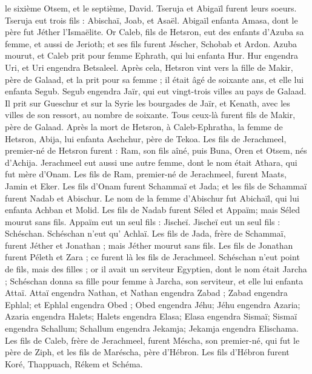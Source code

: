\begin{multicols}{2}
le sixième Otsem, et le septième, David.
Tseruja et Abigaïl furent leurs soeurs. Tseruja eut trois fils : Abischaï, Joab, et Asaël.
Abigaïl enfanta Amasa, dont le père fut Jéther l’Ismaëlite.
Or Caleb, fils de Hetsron, eut des enfants d’Azuba sa femme, et aussi de Jerioth; et ses fils furent Jéscher, Schobab et Ardon.
Azuba mourut, et Caleb prit pour femme Ephrath, qui lui enfanta Hur.
Hur engendra Uri, et Uri engendra Betsaleel.
Après cela, Hetsron vint vers la fille de Makir, père de Galaad, et la prit pour sa femme ; il était âgé de soixante ans, et elle lui enfanta Segub.
Segub engendra Jaïr, qui eut vingt-trois villes au pays de Galaad.
Il prit sur Gueschur et sur la Syrie les bourgades de Jaïr, et Kenath, avec les villes de son ressort, au nombre de soixante. Tous ceux-là furent fils de Makir, père de Galaad.
Après la mort de Hetsron, à Caleb-Ephratha, la femme de Hetsron, Abija, lui enfanta Aschchur, père de Tekoa.
Les fils de Jerachmeel, premier-né de Hetsron furent : Ram, son fils aîné, puis Buna, Oren et Otsem, nés d'Achija.
Jerachmeel eut aussi une autre femme, dont le nom était Athara, qui fut mère d'Onam.
Les fils de Ram, premier-né de Jerachmeel, furent Maats, Jamin et Eker.
Les fils  d'Onam furent  Schammaï et Jada; et les fils de Schammaï furent  Nadab et Abischur.
Le nom de la femme d'Abischur fut Abichaïl, qui lui enfanta Achban et Molid.
Les fils de Nadab furent Séled et Appaïm; mais Séled mourut sans fils.
Appaïm eut un seul fils : Jischeï. Jischeï eut un seul fils : Schéschan. Schéschan n'eut qu' Achlaï.
Les fils de Jada, frère de Schammaï, furent Jéther et Jonathan ; mais Jéther mourut sans fils.
Les fils de Jonathan furent Péleth et Zara ; ce furent là les fils de Jerachmeel.
Schéschan n'eut point de fils, mais des filles ; or il avait un serviteur Egyptien, dont le nom était Jarcha ;
Schéschan donna sa fille pour femme à Jarcha, son serviteur, et elle lui enfanta Attaï.
Attaï engendra Nathan, et Nathan engendra Zabad ;
Zabad engendra Ephlal; et Ephlal engendra Obed ;
 Obed engendra Jéhu; Jéhu engendra Azaria;
Azaria engendra Halets;  Halets engendra Elasa;
Elasa engendra Sismaï; Sismaï engendra Schallum;
Schallum engendra Jekamja; Jekamja engendra Elischama.
Les fils de Caleb, frère de Jerachmeel, furent Méscha, son premier-né, qui fut le père de Ziph, et les fils de Maréscha, père d'Hébron.
Les fils d'Hébron furent  Koré, Thappuach, Rékem et Schéma.

\end{multicols}
